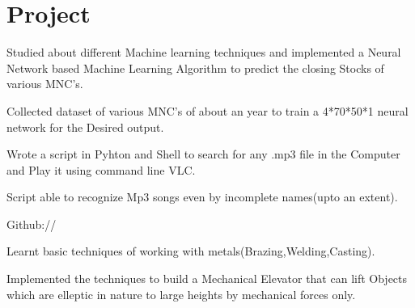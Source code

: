 \documentclass[]{deedy-resume-openfont}
\begin{document}
\hfill
\begin{minipage}[t]{0.66\textwidth} 


\section{Project}

\vspace{\topsep} %
\begin{tightemize}
\item Studied about different Machine learning techniques and implemented a Neural Network based Machine Learning Algorithm to predict the closing Stocks of various MNC's. 
\item Collected dataset of various MNC's of about an year to train a 4*70*50*1 neural network for the Desired output. 
\end{tightemize}
\sectionsep

\begin{tightemize}
\item Wrote a script in Pyhton and Shell to search for any .mp3 file in the Computer and Play it using command line VLC.
\item Script able to recognize Mp3 songs even by incomplete names(upto an extent).
\item Github:// \href{https://github.com/saketharsh/RmSearch}{} \\
\end{tightemize}
\sectionsep

\begin{tightemize}
\item Learnt basic techniques of working with metals(Brazing,Welding,Casting).
\item Implemented the techniques to build a Mechanical Elevator that can lift Objects which are elleptic in nature to large heights by mechanical forces only. 
\end{tightemize}
\sectionsep



\end{minipage}
\end{document}
